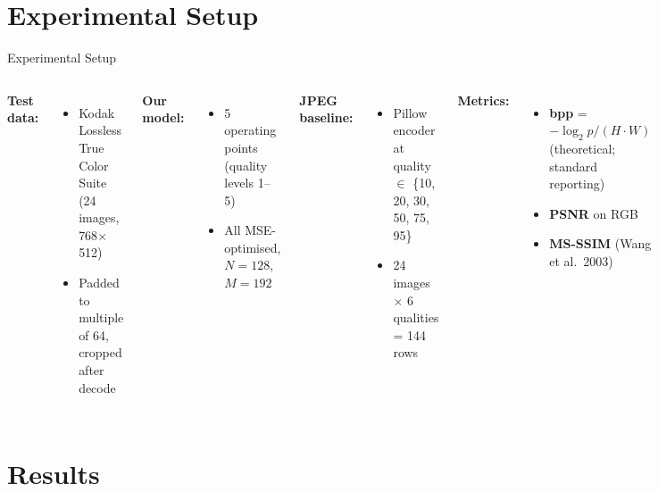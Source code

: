 \documentclass[aspectratio=169, 12pt]{beamer}
\begin{document}
\section{Experimental Setup}

\begin{frame}{Experimental Setup}
    \begin{columns}
        \textbf{Test data:}
        \begin{itemize}
            \item Kodak Lossless True Color Suite (24 images, 768$\times$512)
            \item Padded to multiple of 64, cropped after decode
        \end{itemize}

        \vspace{0.2cm}
        \textbf{Our model:}
        \begin{itemize}
            \item 5 operating points (quality levels 1--5)
            \item All MSE-optimised, $N=128$, $M=192$
        \end{itemize}

        \textbf{JPEG baseline:}
        \begin{itemize}
            \item Pillow encoder at quality $\in$ \{10, 20, 30, 50, 75, 95\}
            \item 24 images $\times$ 6 qualities = 144 rows
        \end{itemize}

        \vspace{0.2cm}
        \textbf{Metrics:}
        \begin{itemize}
            \item \textbf{bpp} = $-\log_2 p / (H \cdot W)$ (theoretical; standard reporting)
            \item \textbf{PSNR} on RGB
            \item \textbf{MS-SSIM} (Wang et al.\ 2003)
        \end{itemize}
    \end{columns}
\end{frame}

\section{Results}
\end{document}
